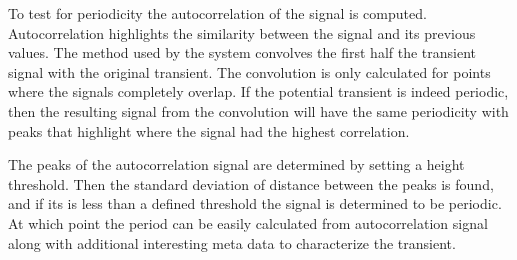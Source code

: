 \documentclass[10pt,conference,compsocconf]{IEEEtran}
\begin{document}
To test for periodicity the autocorrelation of the signal is computed. Autocorrelation highlights the similarity between the signal and its previous values. The method used by the system convolves the first half the transient signal with the original transient. The convolution is only calculated for points where the signals completely overlap. If the potential transient is indeed periodic, then the resulting signal from the convolution will have the same periodicity with peaks that highlight where the signal had the highest correlation. 

The peaks of the autocorrelation signal are determined by setting a height threshold. Then the standard deviation of distance between the peaks is found, and if its is less than a defined threshold the signal is determined to be periodic. At which point the period can be easily calculated from autocorrelation signal along with additional interesting meta data to characterize the transient. 

%
%



%
%
\end{document}
